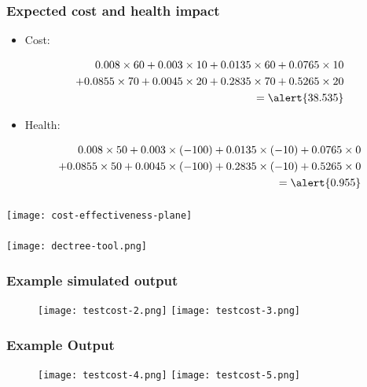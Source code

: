 \begin{frame}
\frametitle{Expected cost and health impact}
	\begin{itemize}
		\item Cost:
		\end{itemize}
\begin{eqnarray*}
&& 0.008 \times 60 + 0.003 \times 10 + 0.0135 \times 60 + 0.0765 \times 10\\
&& + 0.0855 \times 70 + 0.0045 \times 20 + 0.2835 \times 70 + 0.5265 \times 20\\
&& = \alert{38.535}
\end{eqnarray*}
	\begin{itemize}
		\item Health:
		\end{itemize}
\begin{eqnarray*}
&& 0.008 \times 50 + 0.003 \times (-100) + 0.0135 \times (-10) + 0.0765 \times 0\\
&&  + 0.0855 \times 50 + 0.0045 \times (-100) + 0.2835 \times (-10) + 0.5265 \times 0\\
&& = \alert{0.955}
\end{eqnarray*}
\end{frame}


\begin{frame}
\frametitle{}
 \texttt{[image: cost-effectiveness-plane]}
\end{frame}


\begin{frame}
\frametitle{}
 \texttt{[image: dectree-tool.png]}
\end{frame}


\begin{frame}
\frametitle{Example simulated output}
\begin{figure}
\vspace*{-1cm}
	\centering
			\texttt{[image: testcost-2.png]}
		\texttt{[image: testcost-3.png]}
\end{figure}
\end{frame}

\begin{frame}
\frametitle{Example Output}
\begin{figure}
\vspace*{-1cm}
	\centering
			\texttt{[image: testcost-4.png]}
		\texttt{[image: testcost-5.png]}
\end{figure}
\end{frame}

